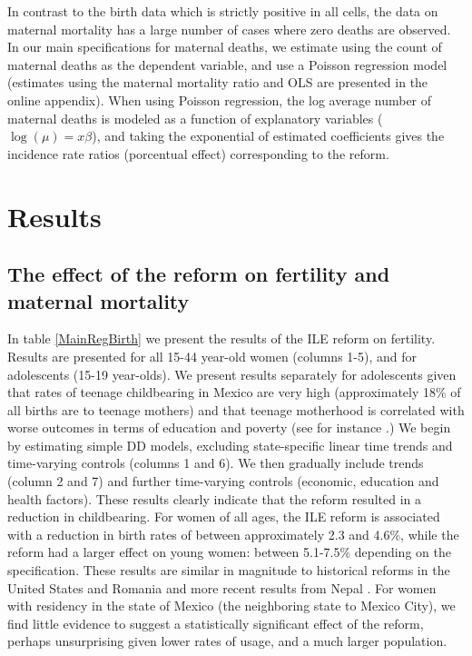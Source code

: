 \documentclass[a4paper, 11pt]{article}
\begin{document}
\begin{spacing}{2}
In contrast to the birth data which is strictly positive in all cells, the data on maternal mortality has a large number of cases where zero deaths are observed.  In our main specifications for maternal deaths, we estimate using the count of maternal deaths as the dependent variable, and use a Poisson regression model (estimates using the maternal mortality ratio and OLS are presented in the online appendix).%
When using Poisson regression, the log average number of maternal deaths is modeled as a function of explanatory variables ($\log(\mu) =x\beta$), and taking the exponential of estimated coefficients gives the incidence rate ratios (porcentual effect) corresponding to the reform.

\section{Results}\label{scn:results}
\subsection{The effect of the reform on fertility and maternal mortality}\label{main}
In table \ref{MainRegBirth} we present the results of the ILE reform on fertility.  Results are presented for all 15-44 year-old women (columns 1-5), and for adolescents (15-19 year-olds).  We present results separately for adolescents given that rates of teenage childbearing in Mexico are very high (approximately 18\% of all births are to teenage mothers) and that teenage motherhood is correlated with worse outcomes in terms of education and poverty (see for instance \citep{furstenberg1976unplanned}.)  We begin by estimating simple DD models, excluding state-specific linear time trends and time-varying controls (columns 1 and 6).  We then gradually include trends (column 2 and 7) and further time-varying controls (economic, education and health factors).  These results clearly indicate that the reform resulted in a reduction in childbearing.  For women of all ages, the ILE reform is associated with a reduction in birth rates of between approximately 2.3 and 4.6\%, while the reform had a larger effect on young women: between 5.1-7.5\% depending on the specification.  These results are similar in magnitude to historical reforms in the United States and Romania \citep{levine2004,PopEleches2010} and more recent results from Nepal \citep{Valente2014}.  For women with residency in the state of Mexico (the neighboring state to Mexico City), we find little evidence to suggest a statistically significant effect of the reform, perhaps unsurprising given lower rates of usage, and a much larger population. 


\end{spacing}
\end{document}
